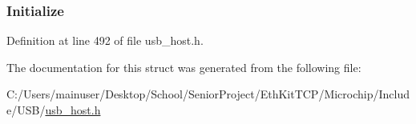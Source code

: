 \subsubsection[{Initialize}]{ Initialize}\label{struct___c_l_i_e_n_t___d_r_i_v_e_r___t_a_b_l_e_a7502b180ac12935de0b4b5dfd8c21e04}


Definition at line 492 of file usb\+\_\+host.\+h.



The documentation for this struct was generated from the following file\+:\begin{DoxyCompactItemize}
\item 
C\+:/\+Users/mainuser/\+Desktop/\+School/\+Senior\+Project/\+Eth\+Kit\+T\+C\+P/\+Microchip/\+Include/\+U\+S\+B/\hyperlink{usb__host_8h}{usb\+\_\+host.\+h}\end{DoxyCompactItemize}
